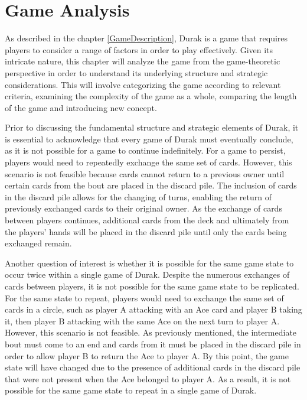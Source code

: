 \chapter{Game Analysis}

As described in the chapter \ref{GameDescription}, Durak is a game that requires players to consider a range of factors in order to play effectively. Given its intricate nature, this chapter will analyze the game from the game-theoretic perspective in order to understand its underlying structure and strategic considerations. This will involve categorizing the game according to relevant criteria, examining the complexity of the game as a whole, comparing the length of the game and introducing new concept.

Prior to discussing the fundamental structure and strategic elements of Durak, it is essential to acknowledge that every game of Durak must eventually conclude, as it is not possible for a game to continue indefinitely. For a game to persist, players would need to repeatedly exchange the same set of cards. However, this scenario is not feasible because cards cannot return to a previous owner until certain cards from the bout are placed in the discard pile. The inclusion of cards in the discard pile allows for the changing of turns, enabling the return of previously exchanged cards to their original owner. As the exchange of cards between players continues, additional cards from the deck and ultimately from the players' hands will be placed in the discard pile until only the cards being exchanged remain.

Another question of interest is whether it is possible for the same game state to occur twice within a single game of Durak. Despite the numerous exchanges of cards between players, it is not possible for the same game state to be replicated. For the same state to repeat, players would need to exchange the same set of cards in a circle, such as player A attacking with an Ace card and player B taking it, then player B attacking with the same Ace on the next turn to player A. However, this scenario is not feasible. As previously mentioned, the intermediate bout must come to an end and cards from it must be placed in the discard pile in order to allow player B to return the Ace to player A. By this point, the game state will have changed due to the presence of additional cards in the discard pile that were not present when the Ace belonged to player A. As a result, it is not possible for the same game state to repeat in a single game of Durak.

